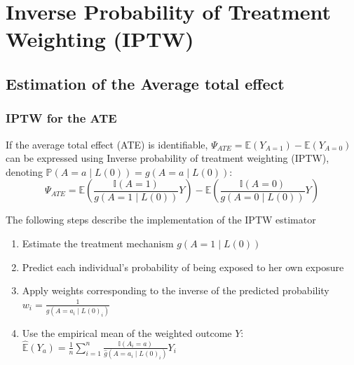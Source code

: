 \documentclass[
]{book}
\begin{document}
\hypertarget{ChapIptw}{%
\chapter{Inverse Probability of Treatment Weighting (IPTW)}\label{ChapIptw}}

\hypertarget{estimation-of-the-average-total-effect}{%
\section{Estimation of the Average total effect}\label{estimation-of-the-average-total-effect}}

\hypertarget{iptw-for-the-ate}{%
\subsection{IPTW for the ATE}\label{iptw-for-the-ate}}

If the average total effect (ATE) is identifiable, \(\Psi_{ATE} = \mathbb{E}(Y_{A=1}) - \mathbb{E}(Y_{A=0})\) can be expressed using Inverse probability of treatment weighting (IPTW), denoting \(\mathbb{P}(A=a \mid L(0)) = g(A=a \mid L(0))\):
\begin{equation}
\Psi_{ATE} = \mathbb{E}\left( \frac{\mathbb{I}(A=1)}{g(A=1 \mid L(0))} Y \right) - \mathbb{E}\left( \frac{\mathbb{I}(A=0)}{g(A=0 \mid L(0))} Y \right)
\end{equation}

The following steps describe the implementation of the IPTW estimator

\begin{enumerate}
\def\labelenumi{\arabic{enumi}.}
\item
  Estimate the treatment mechanism \(g(A=1 \mid L(0))\)
\item
  Predict each individual's probability of being exposed to her own exposure
\item
  Apply weights corresponding to the inverse of the predicted probability \(w_i = \frac{1}{\hat{g}(A = a_i \mid L(0)_i)}\)
\item
  Use the empirical mean of the weighted outcome \(Y\): \(\hat{\mathbb{E}}(Y_a) = \frac{1}{n} \sum_{i=1}^n \frac{\mathbb{I}(A_i=a)}{\hat{g}(A=a_i \mid L(0)_i)} Y_i\)
\end{enumerate}
\end{document}
